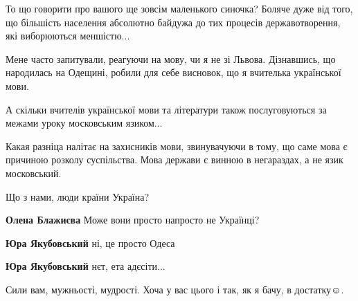 \begin{itemize}
То що говорити про вашого ще зовсім маленького синочка? Боляче дуже від того,
що більшість населення абсолютно байдужа до тих процесів державотворення, які
виборюються меншістю...

Мене часто запитували, реагуючи на мову, чи я не зі Львова. Дізнавшись, що
народилась на Одещині, робили для себе висновок, що я вчителька української
мови.

А скільки вчителів української мови та літератури також послуговуються за
межами уроку московським язиком...

Какая разніца налітає на захисників мови, звинувачуючи в тому, що саме мова є
причиною розколу суспільства. Мова держави є винною в негараздах, а не язик
московський.

Що з нами, люди країни Україна?

\begin{itemize}
 
\textbf{Олена Блажиєва} Може вони просто напросто не Українці?

 
\textbf{Юра Якубовський} ні, це просто Одеса

 
\textbf{Юра Якубовський} нєт, ета адєсіти...
\end{itemize}

 
Сили вам, мужньості, мудрості. Хоча у вас цього і так, як я бачу, в достатку☺️.

 


\end{itemize}
